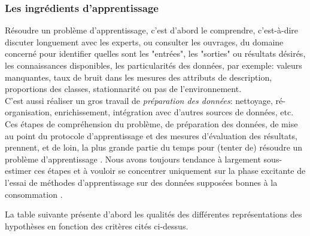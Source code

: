 


\subsubsection{\textbf{Les ingrédients d'apprentissage}}
Résoudre un problème d'apprentissage, c'est d'abord le comprendre, c'est-à-dire discuter longuement avec les experts, ou consulter les ouvrages, du domaine concerné pour identifier quelles sont les "entrées", les  "sorties" ou résultats désirés, les connaissances disponibles, les particularités des données, par exemple: valeurs manquantes, taux de bruit dans les mesures des attributs de description, proportions des classes, stationnarité ou pas de l'environnement.\\ 
C'est aussi réaliser un gros travail de \textit{préparation des données}: nettoyage, ré-organisation, enrichissement, intégration avec d'autres sources de données, etc. Ces étapes de compréhension du problème, de préparation des données, de mise au point du protocole d'apprentissage et des mesures d'évaluation des résultats, prennent, et de loin, la plus grande partie du temps pour (tenter de) résoudre un problème d'apprentissage \cite{antoine2018apprentissage}. 
Nous avons toujours tendance à largement sous-estimer ces étapes et à vouloir se concentrer uniquement sur la phase excitante de l'essai de méthodes d'apprentissage sur des données supposées bonnes à la consommation \cite{darlington2016regression}. 



	La table suivante présente d'abord les qualités des différentes représentations des hypothèses en fonction des critères cités ci-dessus.


